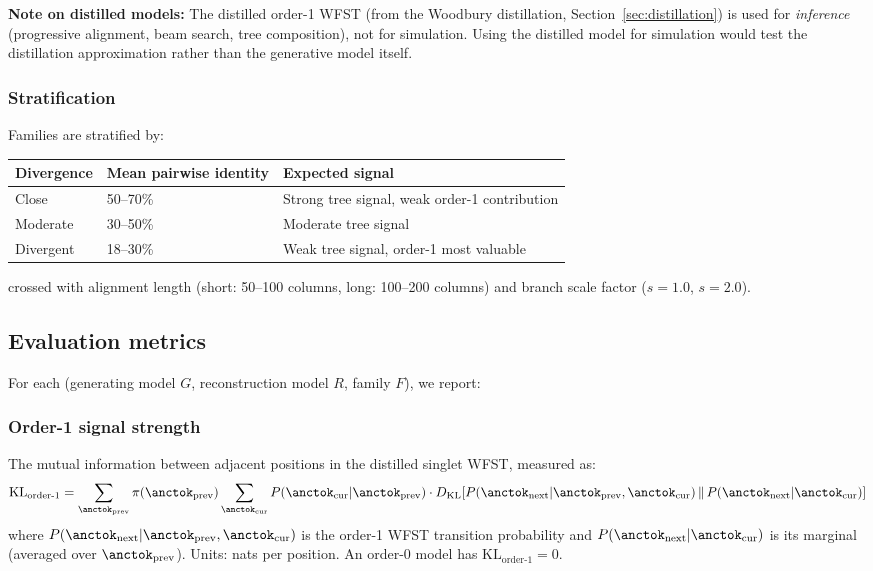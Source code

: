\textbf{Note on distilled models:}
The distilled order-1 WFST (from the Woodbury distillation,
Section~\ref{sec:distillation}) is used for \emph{inference}
(progressive alignment, beam search, tree composition), not for
simulation.  Using the distilled model for simulation would test
the distillation approximation rather than the generative model itself.

\subsubsection{Stratification}

Families are stratified by:
\begin{center}
\begin{tabular}{lll}
\textbf{Divergence} & \textbf{Mean pairwise identity} & \textbf{Expected signal} \\
\hline
Close & 50--70\% & Strong tree signal, weak order-1 contribution \\
Moderate & 30--50\% & Moderate tree signal \\
Divergent & 18--30\% & Weak tree signal, order-1 most valuable \\
\end{tabular}
\end{center}
crossed with alignment length (short: 50--100 columns, long: 100--200 columns)
and branch scale factor ($s = 1.0$, $s = 2.0$).

\subsection{Evaluation metrics}

For each (generating model $G$, reconstruction model $R$, family $F$),
we report:

\subsubsection{Order-1 signal strength}

The mutual information between adjacent positions in the distilled
singlet WFST, measured as:
\begin{equation}
\mathrm{KL}_{\text{order-1}} = \sum_{\anctok_{\text{prev}}} \pi(\anctok_{\text{prev}})
  \sum_{\anctok_{\text{cur}}} P(\anctok_{\text{cur}} | \anctok_{\text{prev}})
  \cdot D_{\mathrm{KL}}\!\left[
    P(\anctok_{\text{next}} | \anctok_{\text{prev}}, \anctok_{\text{cur}})
    \,\|\,
    P(\anctok_{\text{next}} | \anctok_{\text{cur}})
  \right]
\end{equation}
where $P(\anctok_{\text{next}} | \anctok_{\text{prev}}, \anctok_{\text{cur}})$
is the order-1 WFST transition probability and
$P(\anctok_{\text{next}} | \anctok_{\text{cur}})$ is its marginal
(averaged over $\anctok_{\text{prev}}$).
Units: nats per position.
An order-0 model has $\mathrm{KL}_{\text{order-1}} = 0$.


